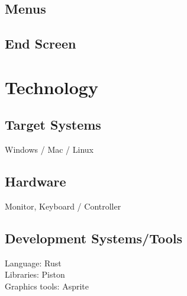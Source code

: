 \documentclass[a4paper]{scrreprt}
\begin{document}
\section{Menus}

\section{End Screen}




\chapter{Technology}

\section{Target Systems}
Windows / Mac / Linux

\section{Hardware}
Monitor, Keyboard / Controller

\section{Development Systems/Tools}
Language: Rust\\
Libraries: Piston\\
Graphics tools: Asprite
\end{document}
